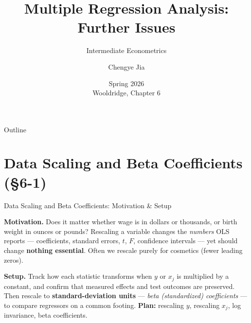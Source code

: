 \documentclass[aspectratio=169, 12pt]{beamer}
\title[L5: Further Issues]{Multiple Regression Analysis: Further Issues}
\subtitle{Intermediate Econometrics}
\author[SUFE Econometrics]{Chengye Jia}
\institute{%
  Department of Economics \\
  Shandong University of Finance and Economics}
\date{Spring 2026 \\ \smallskip \scriptsize Wooldridge, Chapter 6}
\begin{document}

\begin{frame}[plain]
  \titlepage
\end{frame}

\begin{frame}[shrink=10]{Outline}
  \tableofcontents
\end{frame}

\section{Data Scaling and Beta Coefficients (\S6-1)}

\begin{frame}{Data Scaling and Beta Coefficients: Motivation \& Setup}

  \begin{highlightbox}
    \textbf{Motivation.} Does it matter whether wage is in dollars or thousands, or
    birth weight in ounces or pounds? Rescaling a variable changes the \emph{numbers}
    OLS reports --- coefficients, standard errors, $t$, $F$, confidence intervals ---
    yet should change \textbf{nothing essential}. Often we rescale purely for cosmetics
    (fewer leading zeros).
  \end{highlightbox}

  \begin{keybox}
    \textbf{Setup.} Track how each statistic transforms when $y$ or $x_j$ is multiplied
    by a constant, and confirm that measured effects and test outcomes are preserved.
    Then rescale to \textbf{standard-deviation units} --- \emph{beta (standardized)
    coefficients} --- to compare regressors on a common footing. \textbf{Plan:}
    rescaling $y$, rescaling $x_j$, log invariance, beta coefficients.
  \end{keybox}

\end{frame}
\end{document}
